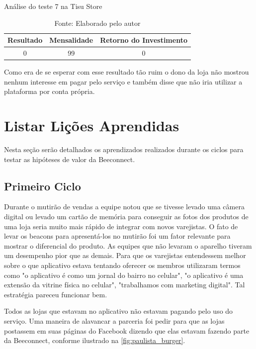 \begin{table}[H]
\centering
\caption{Análise do teste 7 na Tisu Store}
\label{tab:resultado_7_tisu_store_b}
\begin{tabular}{|c|c|c|}
\hline
Resultado & Mensalidade & Retorno do Investimento \\ \hline
0             & 99          &   0 \\ \hline
\end{tabular}
\caption* {Fonte: Elaborado pelo autor}    
\end{table}

Como era de se esperar com esse resultado tão ruim o dono da loja não mostrou nenhum interesse em pagar pelo serviço e também disse que não iria utilizar a plataforma por conta própria. 

\section{Listar Lições Aprendidas}
\label{cha:listar_licoes_aprendidas}
Nesta seção serão detalhados os aprendizados realizados durante os ciclos para testar as hipóteses de valor da Beeconnect.

\subsection{Primeiro Ciclo}
\label{cha:primeiro_ciclo}
Durante o mutirão de vendas a equipe notou que se tivesse levado uma câmera digital ou levado um cartão de memória para conseguir as fotos dos produtos de uma loja seria muito mais rápido de integrar com novos varejistas.
O fato de levar os beacons para apresentá-los no mutirão foi um fator relevante para mostrar o diferencial do produto. As equipes que não levaram o aparelho tiveram um desempenho pior que as demais.
Para que os varejistas entendessem melhor sobre o que aplicativo estava tentando oferecer os membros utilizaram termos como "o aplicativo é como um jornal do bairro no celular", "o aplicativo é uma extensão da vitrine física no celular", "trabalhamos com marketing digital". Tal estratégia pareceu funcionar bem.

Todos as lojas que estavam no aplicativo não estavam pagando pelo uso do serviço. Uma maneira de alavancar a parceria foi pedir para que as lojas postassem em suas páginas do Facebook dizendo que elas estavam fazendo parte da Beeconnect, conforme ilustrado na \autoref{fig:paulista_burger}.

